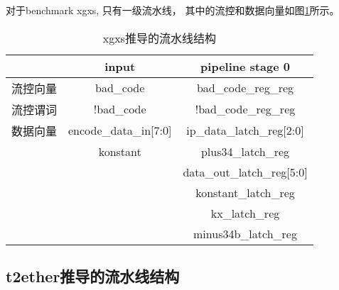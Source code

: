 对于benchmark xgxs,
只有一级流水线，
其中的流控和数据向量如图\ref{tab_xgxs}所示。

\begin{table}[b]
\centering
\caption{xgxs推导的流水线结构}
\begin{tabular}{|c|c|c|}
\hline
                       & input                  &  pipeline stage 0    \\\hline\hline
流控向量               &bad\_code               & bad\_code\_reg\_reg\\\hline
流控谓词               &!bad\_code              & !bad\_code\_reg\_reg \\\hline
数据向量               &encode\_data\_in[7:0]   &ip\_data\_latch\_reg[2:0] \\
                       &konstant                &plus34\_latch\_reg     \\
                       &                        &data\_out\_latch\_reg[5:0]\\
                       &                        &konstant\_latch\_reg   \\
                       &                        &kx\_latch\_reg         \\
                       &                        &minus34b\_latch\_reg   \\\hline
\end{tabular}\label{tab_xgxs}
\end{table}


\subsection{t2ether推导的流水线结构}


